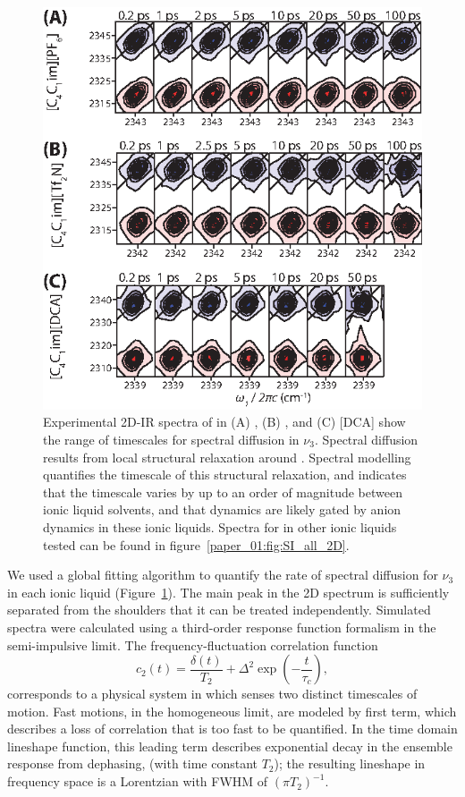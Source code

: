 \documentclass[%
  class = book,%
  crop = false,%
  float = true,%
  multi = true,%
  preview = false,%
]{standalone}
\begin{document}
{\begin{figure}
  \centering
  \includegraphics[scale=1.40]{fig7.eps}
  \caption[Experimental 2D-IR spectra of \texorpdfstring{}{carbon dioxide} in \ce{[Im_{4,1}][X]}]{Experimental 2D-IR spectra of  in \ce{[Im_{4,1}]} (A) \ce{[PF6]}, (B) \ce{[Tf2N]}, and (C) [DCA] show the range of timescales for spectral diffusion in \(\nu_3\). Spectral diffusion results from local structural relaxation around . Spectral modelling quantifies the timescale of this structural relaxation, and indicates that the timescale varies by up to an order of magnitude between ionic liquid solvents, and that  dynamics are likely gated by anion dynamics in these ionic liquids. Spectra for  in other ionic liquids tested can be found in figure~\ref{paper_01:fig:SI_all_2D}.}
  \label{fig:all 2D}
\end{figure}

We used a global fitting algorithm to quantify the rate of spectral diffusion for \(\nu_3\) in each ionic liquid (Figure~\ref{fig:all 2D}). The main peak in the 2D spectrum is sufficiently separated from the shoulders that it can be treated independently. Simulated spectra were calculated using a third-order response function formalism in the semi-impulsive limit. The frequency-fluctuation correlation function
\begin{equation}
  \label{eq:c2}
  c_{2}(t) = \frac{\delta(t)}{T_2} + \Delta^2 \exp \left( -\frac{t}{\tau_c} \right),
\end{equation}
corresponds to a physical system in which  senses two distinct timescales of motion. Fast motions, in the homogeneous limit, are modeled by first term, which describes a loss of correlation that is too fast to be quantified. In the time domain lineshape function, this leading term describes exponential decay in the ensemble response from dephasing, (with time constant \(T_2\)); the resulting lineshape in frequency space is a Lorentzian with FWHM of \(\left( \pi T_{2} \right)^{-1}\).

}
\end{document}
